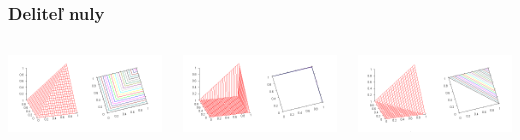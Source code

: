 \documentclass{beamer}
\begin{document}
\begin{frame}
\frametitle{Deliteľ nuly}
\begin{columns}
\begin{minipage}[c][0.4\textheight][c]{\linewidth}
  \centering
  \includegraphics[width=0.9\linewidth]{MinimumTnorm}
\end{minipage}
\begin{minipage}[c][0.4\textheight][c]{\linewidth}
  \centering
  \includegraphics[width=0.9\linewidth]{DrasticTnorm}
\end{minipage}
\begin{minipage}[c][0.4\textheight][c]{\linewidth}
  \centering
  \includegraphics[width=0.9\linewidth]{LukasiewiczTnorm}

\end{minipage}
\end{columns}
\end{frame}
\end{document}
